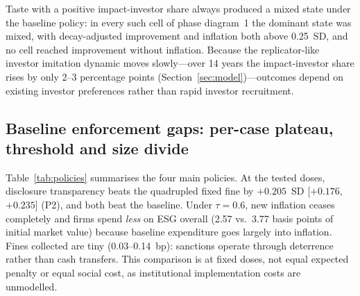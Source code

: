 \documentclass[11pt]{article}
\begin{document}
Taste with a positive impact-investor share always produced a mixed state under the baseline policy: in every such cell of phase diagram~1 the dominant state was mixed, with decay-adjusted improvement and inflation both above 0.25~SD, and no cell reached improvement without inflation. Because the replicator-like investor imitation dynamic moves slowly---over 14 years the impact-investor share rises by only 2--3 percentage points (Section~\ref{sec:model})---outcomes depend on existing investor preferences rather than rapid investor recruitment.

\subsection{Baseline enforcement gaps: per-case plateau, threshold and size divide}\label{sec:instruments}

Table~\ref{tab:policies} summarises the four main policies. At the tested doses, disclosure transparency beats the quadrupled fixed fine by $+0.205$~SD [$+0.176$, $+0.235$] (P2), and both beat the baseline. Under $\tau = 0.6$, new inflation ceases completely and firms spend \emph{less} on ESG overall (2.57 vs.\ 3.77 basis points of initial market value) because baseline expenditure goes largely into inflation. Fines collected are tiny (0.03--0.14~bp): sanctions operate through deterrence rather than cash transfers. This comparison is at fixed doses, not equal expected penalty or equal social cost, as institutional implementation costs are unmodelled.
\end{document}
